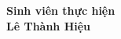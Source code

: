 \vspace{1cm}
\begin{right}
    \textbf{Sinh viên thực hiện}\\[1.5cm]
    \textbf{Lê Thành Hiệu}
\end{right}

\newpage

\tableofcontents
\newpage

\listoftables
\newpage

\listoffigures
\newpage
